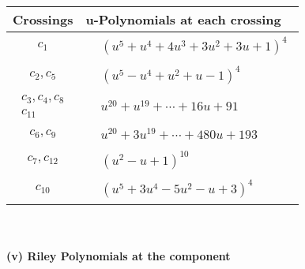 \documentclass[1p]{elsarticle_modified}
\theoremstyle{definition}
\begin{document}
\begin{tabular}{m{50pt}|m{274pt}}
Crossings & \hspace{64pt}u-Polynomials at each crossing \\
\hline $$\begin{aligned}c_{1}\end{aligned}$$&$\begin{aligned}
&(u^5+u^4+4 u^3+3 u^2+3 u+1)^4
\end{aligned}$\\
\hline $$\begin{aligned}c_{2},c_{5}\end{aligned}$$&$\begin{aligned}
&(u^5- u^4+u^2+u-1)^4
\end{aligned}$\\
\hline $$\begin{aligned}c_{3},c_{4},c_{8}\\c_{11}\end{aligned}$$&$\begin{aligned}
&u^{20}+u^{19}+\cdots+16 u+91
\end{aligned}$\\
\hline $$\begin{aligned}c_{6},c_{9}\end{aligned}$$&$\begin{aligned}
&u^{20}+3 u^{19}+\cdots+480 u+193
\end{aligned}$\\
\hline $$\begin{aligned}c_{7},c_{12}\end{aligned}$$&$\begin{aligned}
&(u^2- u+1)^{10}
\end{aligned}$\\
\hline $$\begin{aligned}c_{10}\end{aligned}$$&$\begin{aligned}
&(u^5+3 u^4-5 u^2- u+3)^4
\end{aligned}$\\
\hline
\end{tabular}\\~\\
\newpage\renewcommand{\arraystretch}{1}
\flushleft \textbf{(v) Riley Polynomials at the component}\newline \\
\end{document}

